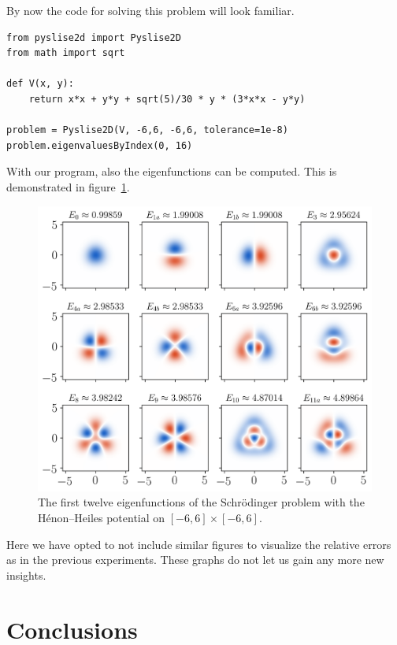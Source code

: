 By now the code for solving this problem will look familiar.

\begin{verbatim}
from pyslise2d import Pyslise2D
from math import sqrt

def V(x, y):
    return x*x + y*y + sqrt(5)/30 * y * (3*x*x - y*y)

problem = Pyslise2D(V, -6,6, -6,6, tolerance=1e-8)
problem.eigenvaluesByIndex(0, 16)
\end{verbatim}

With our program, also the eigenfunctions can be computed. This is demonstrated in figure~\ref{fig:henon_heiles_eigenfunction}.
\begin{figure}
  \begin{center}
    \includegraphics[width=\linewidth]{img/chapter3/experiments/henon_heiles_eigenfunctions.png}
    \caption{\label{fig:henon_heiles_eigenfunction} The first twelve eigenfunctions of the Schrödinger problem with the Hénon--Heiles potential on $[-6, 6]\times[-6,6]$.}
  \end{center}
\end{figure}

Here we have opted to not include similar figures to visualize the relative errors as in the previous experiments. These graphs do not let us gain any more new insights.

\section{Conclusions}

